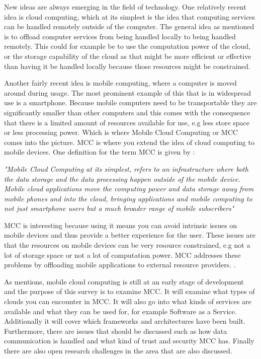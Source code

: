 New ideas are always emerging in the field of technology.
One relatively recent idea is cloud computing, which at its simplest is the idea that computing services can be handled remotely outside of the computer. 
The general idea as mentioned is to offload computer services from being handled locally to being handled remotely. 
This could for example be to use the computation power of the cloud, or the storage capability of the cloud as that might be more efficient or effective than having it be handled locally because those resources might be constrained.

Another fairly recent idea is mobile computing, where a computer is moved around during usage.
The most prominent example of this that is in widespread use is a smartphone.
Because mobile computers need to be transportable they are significantly smaller than other computers and this comes with the consequence that there is a limited amount of resources available for use, e.g less store space or less processing power.
Which is where Mobile Cloud Computing or MCC comes into the picture. 
MCC is where you extend the idea of cloud computing to mobile devices.
One definition for the term MCC is given by \citet{article:mobilecloudreviewinderkildesecurity}:

\textit{"Mobile Cloud Computing at its simplest, refers to an infrastructure where both the data storage and the data processing happen outside of the mobile device. Mobile cloud applications move the computing power and data storage away from mobile phones and into the cloud, bringing applications and mobile computing to not just smartphone users but a much broader range of mobile subscribers"}

MCC is interesting because using it means you can avoid intrinsic issues on mobile devices and thus provide a better experience for the user. 
These issues are that the resources on mobile devices can be very resource constrained, e.g not a lot of storage space or not a lot of computation power.
MCC addresses these problems by offloading mobile applications to external resource providers. \citet{fernando2013mobile}.

As \citet{6215350} mentions, mobile cloud computing is still at an early stage of development and the purpose of this survey is to examine MCC. 
It will examine what types of clouds you can encounter in MCC.
It will also go into what kinds of services are available and what they can be used for, for example Software as a Service.
Additionally it will cover which frameworks and architectures have been built. 
Furthermore, there are issues that should be discussed such as how data communication is handled and what kind of trust and security MCC has. 
Finally there are also open research challenges in the area that are also discussed. 